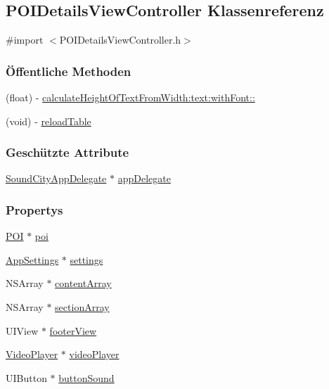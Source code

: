 \hypertarget{interface_p_o_i_details_view_controller}{
\subsection{POIDetailsViewController Klassenreferenz}
\label{interface_p_o_i_details_view_controller}
}


{\ttfamily \#import $<$POIDetailsViewController.h$>$}\subsubsection*{Öffentliche Methoden}
\begin{DoxyCompactItemize}
\item 
(float) -\/ \hyperlink{interface_p_o_i_details_view_controller_aecbd2dd213ae01d4c01c2bcb53da55d3}{calculateHeightOfTextFromWidth:text:withFont::}
\item 
(void) -\/ \hyperlink{interface_p_o_i_details_view_controller_a2c795e3ef76b754c8ff16f6334189472}{reloadTable}
\end{DoxyCompactItemize}
\subsubsection*{Geschützte Attribute}
\begin{DoxyCompactItemize}
\item 
\hyperlink{interface_sound_city_app_delegate}{SoundCityAppDelegate} $\ast$ \hyperlink{interface_p_o_i_details_view_controller_a399b6acaa417e7921abf51b70de6fd22}{appDelegate}
\end{DoxyCompactItemize}
\subsubsection*{Propertys}
\begin{DoxyCompactItemize}
\item 
\hyperlink{interface_p_o_i}{POI} $\ast$ \hyperlink{interface_p_o_i_details_view_controller_a9891551c8855e8c76c160fbc32d6c99e}{poi}
\item 
\hyperlink{interface_app_settings}{AppSettings} $\ast$ \hyperlink{interface_p_o_i_details_view_controller_aa7b02f858154ff80725c355aad693658}{settings}
\item 
NSArray $\ast$ \hyperlink{interface_p_o_i_details_view_controller_a7652ae673a08d785ae1699559b39344b}{contentArray}
\item 
NSArray $\ast$ \hyperlink{interface_p_o_i_details_view_controller_ad31edb83a1fd1d6f6af800f293a25334}{sectionArray}
\item 
UIView $\ast$ \hyperlink{interface_p_o_i_details_view_controller_a5b670e066edf54f1f94ff6c521aafad1}{footerView}
\item 
\hyperlink{interface_video_player}{VideoPlayer} $\ast$ \hyperlink{interface_p_o_i_details_view_controller_ac1d9379646041b896d3d66f4ccacdd16}{videoPlayer}
\item 
UIButton $\ast$ \hyperlink{interface_p_o_i_details_view_controller_a35c04f7920916d5236c5d076580600a8}{buttonSound}
\end{DoxyCompactItemize}


